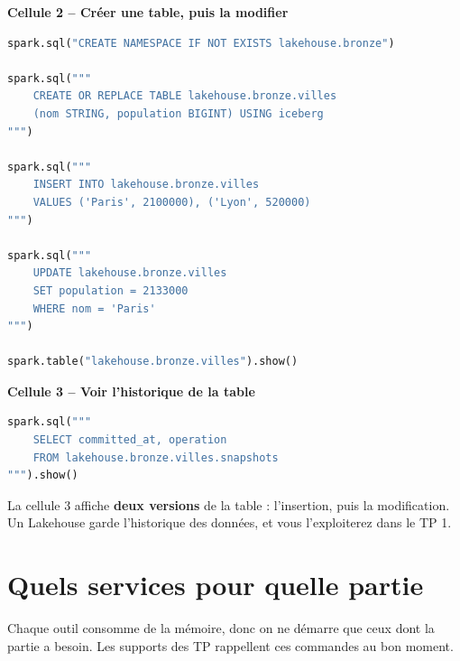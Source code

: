 \textbf{Cellule 2 -- Créer une table, puis la modifier}
\begin{lstlisting}[language=Python]
spark.sql("CREATE NAMESPACE IF NOT EXISTS lakehouse.bronze")

spark.sql("""
    CREATE OR REPLACE TABLE lakehouse.bronze.villes
    (nom STRING, population BIGINT) USING iceberg
""")

spark.sql("""
    INSERT INTO lakehouse.bronze.villes
    VALUES ('Paris', 2100000), ('Lyon', 520000)
""")

spark.sql("""
    UPDATE lakehouse.bronze.villes
    SET population = 2133000
    WHERE nom = 'Paris'
""")

spark.table("lakehouse.bronze.villes").show()
\end{lstlisting}

\textbf{Cellule 3 -- Voir l'historique de la table}
\begin{lstlisting}[language=Python]
spark.sql("""
    SELECT committed_at, operation
    FROM lakehouse.bronze.villes.snapshots
""").show()
\end{lstlisting}

\begin{resultat}
La cellule 3 affiche \textbf{deux versions} de la table : l'insertion, puis la modification.
Un Lakehouse garde l'historique des données, et vous l'exploiterez dans le TP 1.
\end{resultat}

\section{Quels services pour quelle partie}\label{c2:sec:services}

Chaque outil consomme de la mémoire, donc on ne démarre que ceux dont la partie a besoin. Les
supports des TP rappellent ces commandes au bon moment.

